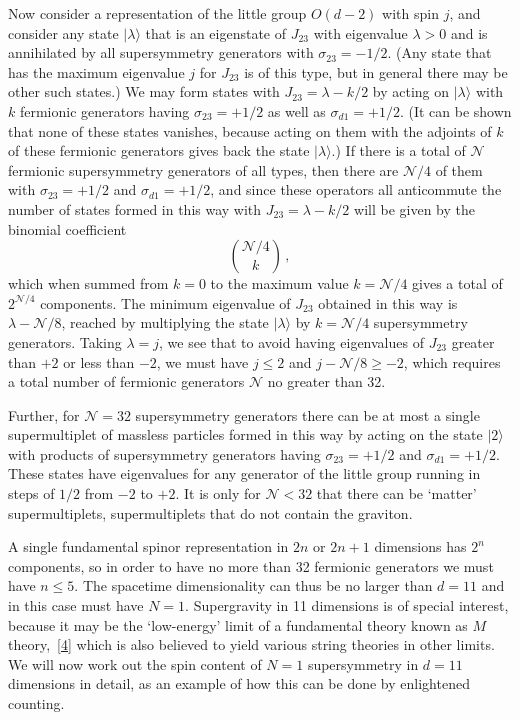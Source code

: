 Now consider a representation of the little group \(O(d-2)\) with spin
\(j\), and consider any state \(\lvert\lambda\rangle\) that is an
eigenstate of \(J_{23}\) with eigenvalue \(\lambda>0\) and is annihilated
by all supersymmetry generators with \(\sigma_{23}=-1/2\). (Any state that
has the maximum eigenvalue \(j\) for \(J_{23}\) is of this type, but in
general there may be other such states.) We may form states with
\(J_{23}=\lambda-k/2\) by acting on \(\lvert\lambda\rangle\) with \(k\)
fermionic generators having \(\sigma_{23}=+1/2\) as well as
\(\sigma_{d1}=+1/2\). (It can be shown that none of these states vanishes,
because acting on them with the adjoints of \(k\) of these fermionic
generators gives back the state \(\lvert\lambda\rangle\).) If there is a
total of \(\mathcal N\) fermionic supersymmetry generators of all types,
then there are \(\mathcal N/4\) of them with \(\sigma_{23}=+1/2\) and
\(\sigma_{d1}=+1/2\), and since these operators all anticommute the number
of states formed in this way with \(J_{23}=\lambda-k/2\) will be given by
the binomial coefficient
\begin{equation}
  \binom{\mathcal N/4}{k}\,,
  \tag{32.2.1}\label{eq:32.2.1}
\end{equation}
which when summed from \(k=0\) to the maximum value \(k=\mathcal N/4\)
gives a total of \(2^{\mathcal N/4}\) components. The minimum eigenvalue
of \(J_{23}\) obtained in this way is \(\lambda-\mathcal N/8\), reached
by multiplying the state \(\lvert\lambda\rangle\) by \(k=\mathcal N/4\)
supersymmetry generators. Taking \(\lambda=j\), we see that to avoid
having eigenvalues of \(J_{23}\) greater than \(+2\) or less than \(-2\),
we must have \(j\leq2\) and \(j-\mathcal N/8\geq-2\), which requires a
total number of fermionic generators \(\mathcal N\) no greater than 32.

Further, for \(\mathcal N=32\) supersymmetry generators there can be at
most a single supermultiplet of massless particles formed in this way by
acting on the state \(\lvert2\rangle\) with products of supersymmetry
generators having \(\sigma_{23}=+1/2\) and \(\sigma_{d1}=+1/2\). These
states have eigenvalues for any generator of the little group running in
steps of \(1/2\) from \(-2\) to \(+2\). It is only for
\(\mathcal N<32\) that there can be `matter' supermultiplets,
supermultiplets that do not contain the graviton.

A single fundamental spinor representation in \(2n\) or \(2n+1\)
dimensions has \(2^n\) components, so in order to have no more than 32
fermionic generators we must have \(n\leq5\). The spacetime dimensionality
can thus be no larger than \(d=11\) and in this case must have \(N=1\).
Supergravity in 11 dimensions is of special interest, because it may be
the `low-energy' limit of a fundamental theory known as
\(M\) theory,~\hyperref[ch32-ref-4]{[4]} which is also believed to yield
various string theories in other limits. We will now work out the spin
content of \(N=1\) supersymmetry in \(d=11\) dimensions in detail, as an
example of how this can be done by enlightened counting.

